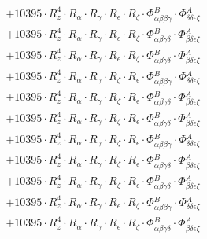 \documentclass{article}
\begin{document}
\begin{subequations}
\begin{gather}
\begin{array}{c}
 \\[0.2em] 		 + 10395 \cdot R_{z}^{4} \cdot R_{\alpha{}} \cdot R_{\gamma{}} \cdot R_{\epsilon{}} \cdot R_{\zeta{}} \cdot \Phi{}^{B}_{\alpha{}\beta{}\beta{}\gamma{}} \cdot \Phi{}^{A}_{\delta{}\delta{}\epsilon{}\zeta{}} 
 \\[0.2em] 		 + 10395 \cdot R_{z}^{4} \cdot R_{\alpha{}} \cdot R_{\gamma{}} \cdot R_{\epsilon{}} \cdot R_{\zeta{}} \cdot \Phi{}^{B}_{\alpha{}\beta{}\gamma{}\delta{}} \cdot \Phi{}^{A}_{\beta{}\delta{}\epsilon{}\zeta{}} 
 \\[0.2em] 		 + 10395 \cdot R_{z}^{4} \cdot R_{\alpha{}} \cdot R_{\gamma{}} \cdot R_{\epsilon{}} \cdot R_{\zeta{}} \cdot \Phi{}^{B}_{\alpha{}\beta{}\gamma{}\delta{}} \cdot \Phi{}^{A}_{\beta{}\delta{}\epsilon{}\zeta{}} 
 \\[0.2em] 		 + 10395 \cdot R_{z}^{4} \cdot R_{\alpha{}} \cdot R_{\gamma{}} \cdot R_{\zeta{}} \cdot R_{\epsilon{}} \cdot \Phi{}^{B}_{\alpha{}\beta{}\beta{}\gamma{}} \cdot \Phi{}^{A}_{\delta{}\delta{}\epsilon{}\zeta{}} 
 \\[0.2em] 		 + 10395 \cdot R_{z}^{4} \cdot R_{\alpha{}} \cdot R_{\gamma{}} \cdot R_{\zeta{}} \cdot R_{\epsilon{}} \cdot \Phi{}^{B}_{\alpha{}\beta{}\gamma{}\delta{}} \cdot \Phi{}^{A}_{\beta{}\delta{}\epsilon{}\zeta{}} 
 \\[0.2em] 		 + 10395 \cdot R_{z}^{4} \cdot R_{\alpha{}} \cdot R_{\gamma{}} \cdot R_{\zeta{}} \cdot R_{\epsilon{}} \cdot \Phi{}^{B}_{\alpha{}\beta{}\gamma{}\delta{}} \cdot \Phi{}^{A}_{\beta{}\delta{}\epsilon{}\zeta{}} 
 \\[0.2em] 		 + 10395 \cdot R_{z}^{4} \cdot R_{\alpha{}} \cdot R_{\gamma{}} \cdot R_{\zeta{}} \cdot R_{\epsilon{}} \cdot \Phi{}^{B}_{\alpha{}\beta{}\beta{}\gamma{}} \cdot \Phi{}^{A}_{\delta{}\delta{}\epsilon{}\zeta{}} 
 \\[0.2em] 		 + 10395 \cdot R_{z}^{4} \cdot R_{\alpha{}} \cdot R_{\gamma{}} \cdot R_{\zeta{}} \cdot R_{\epsilon{}} \cdot \Phi{}^{B}_{\alpha{}\beta{}\gamma{}\delta{}} \cdot \Phi{}^{A}_{\beta{}\delta{}\epsilon{}\zeta{}} 
 \\[0.2em] 		 + 10395 \cdot R_{z}^{4} \cdot R_{\alpha{}} \cdot R_{\gamma{}} \cdot R_{\zeta{}} \cdot R_{\epsilon{}} \cdot \Phi{}^{B}_{\alpha{}\beta{}\gamma{}\delta{}} \cdot \Phi{}^{A}_{\beta{}\delta{}\epsilon{}\zeta{}} 
 \\[0.2em] 		 + 10395 \cdot R_{z}^{4} \cdot R_{\alpha{}} \cdot R_{\gamma{}} \cdot R_{\epsilon{}} \cdot R_{\zeta{}} \cdot \Phi{}^{B}_{\alpha{}\beta{}\beta{}\gamma{}} \cdot \Phi{}^{A}_{\delta{}\delta{}\epsilon{}\zeta{}} 
 \\[0.2em] 		 + 10395 \cdot R_{z}^{4} \cdot R_{\alpha{}} \cdot R_{\gamma{}} \cdot R_{\epsilon{}} \cdot R_{\zeta{}} \cdot \Phi{}^{B}_{\alpha{}\beta{}\gamma{}\delta{}} \cdot \Phi{}^{A}_{\beta{}\delta{}\epsilon{}\zeta{}} 

\end{array}
\end{gather}
\end{subequations}
\end{document}
